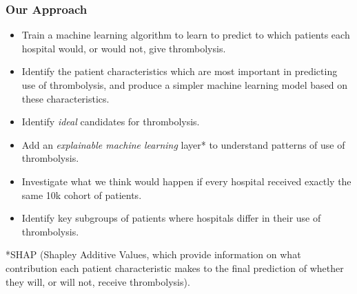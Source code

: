 \begin{frame}
\frametitle{Our Approach}

\small

\begin{itemize}
    \item Train a machine learning algorithm to learn to predict to which patients each hospital would, or would not, give thrombolysis.
    \item Identify the patient characteristics which are most important in predicting use of thrombolysis, and produce a simpler machine learning model based on these characteristics.
    \item Identify \emph{ideal} candidates for thrombolysis.
    \item Add an \emph{explainable machine learning} layer* to understand patterns of use of thrombolysis.
    \item Investigate what we think would happen if every hospital received exactly the same 10k cohort of patients.
    \item Identify key subgroups of patients where hospitals differ in their use of thrombolysis.
\end{itemize}

\vspace{3mm}
\footnotesize
*SHAP (Shapley Additive Values, which provide information on what contribution each patient characteristic makes to the final prediction of whether they will, or will not, receive thrombolysis).
\end{frame}
